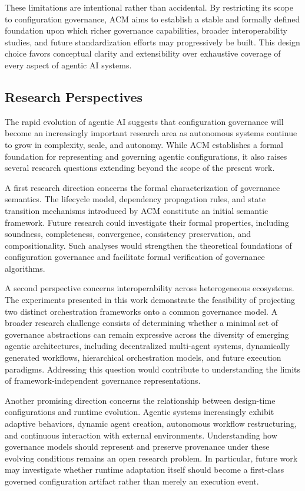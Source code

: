 \documentclass[10pt]{article}
\begin{document}
These limitations are intentional rather than accidental. By restricting its scope to configuration governance, ACM aims to establish a stable and formally defined foundation upon which richer governance capabilities, broader interoperability studies, and future standardization efforts may progressively be built. This design choice favors conceptual clarity and extensibility over exhaustive coverage of every aspect of agentic AI systems.

\subsection{Research Perspectives}

The rapid evolution of agentic AI suggests that configuration governance will become an increasingly important research area as autonomous systems continue to grow in complexity, scale, and autonomy. While ACM establishes a formal foundation for representing and governing agentic configurations, it also raises several research questions extending beyond the scope of the present work.

A first research direction concerns the formal characterization of governance semantics. The lifecycle model, dependency propagation rules, and state transition mechanisms introduced by ACM constitute an initial semantic framework. Future research could investigate their formal properties, including soundness, completeness, convergence, consistency preservation, and compositionality. Such analyses would strengthen the theoretical foundations of configuration governance and facilitate formal verification of governance algorithms.

A second perspective concerns interoperability across heterogeneous ecosystems. The experiments presented in this work demonstrate the feasibility of projecting two distinct orchestration frameworks onto a common governance model. A broader research challenge consists of determining whether a minimal set of governance abstractions can remain expressive across the diversity of emerging agentic architectures, including decentralized multi-agent systems, dynamically generated workflows, hierarchical orchestration models, and future execution paradigms. Addressing this question would contribute to understanding the limits of framework-independent governance representations.

Another promising direction concerns the relationship between design-time configurations and runtime evolution. Agentic systems increasingly exhibit adaptive behaviors, dynamic agent creation, autonomous workflow restructuring, and continuous interaction with external environments. Understanding how governance models should represent and preserve provenance under these evolving conditions remains an open research problem. In particular, future work may investigate whether runtime adaptation itself should become a first-class governed configuration artifact rather than merely an execution event.
\end{document}
